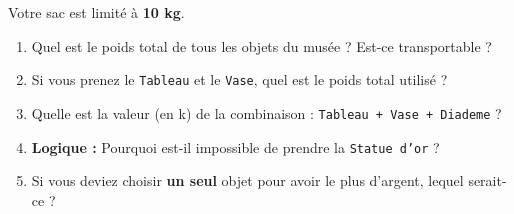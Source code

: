 \begin{Exercise}[title={Analyse des contraintes }]
Votre sac est limité à \textbf{10 kg}.
\begin{enumerate}
    \item  Quel est le poids total de tous les objets du musée ? Est-ce transportable ? \dotfill
    \item  Si vous prenez le \texttt{Tableau} et le \texttt{Vase}, quel est le poids total utilisé ? \dotfill
    \item Quelle est la valeur (en k\texteuro) de la combinaison : \texttt{Tableau + Vase + Diademe} ? \dotfill
    \item \textbf{Logique :} Pourquoi est-il impossible de prendre la \texttt{Statue d'or} ? \dotfill
    \item  Si vous deviez choisir \textbf{un seul} objet pour avoir le plus d'argent, lequel serait-ce ? \dotfill
\end{enumerate}
\end{Exercise}

\newpage

